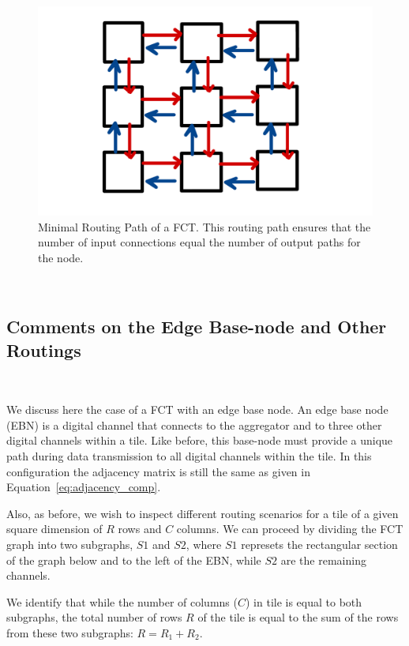 \begin{figure}[]
\centering
\includegraphics[width=\textwidth]{images/Broadcast.pdf}
\caption{Minimal Routing Path of a FCT. This routing path ensures that the number of input connections equal the number of output paths for the node.}
\end{figure}~\label{fig:broadcast}

\subsection{Comments on the Edge Base-node and Other Routings}~\label{sec:base_node}

We discuss here the case of a FCT with an edge base node.
An edge base node (EBN) is a digital channel that connects to the aggregator and to three other digital channels within a tile.
Like before, this base-node must provide a unique path during data transmission to all digital channels within the tile.
In this configuration the adjacency matrix is still the same as given in Equation~\ref{eq:adjacency_comp}.

Also, as before, we wish to inspect different routing scenarios for a tile of a given square dimension of $R$ rows and $C$ columns.
We can proceed by dividing the FCT graph into two subgraphs, $S1$ and $S2$, where $S1$ represets the rectangular section of the graph below and to the left of the EBN, while $S2$ are the remaining channels.

We identify that while the number of columns ($C$) in tile is equal to both subgraphs, the total number of rows $R$ of the tile is equal to the sum of the rows from these two subgraphs: $R = R_{1} + R_{2}$.

